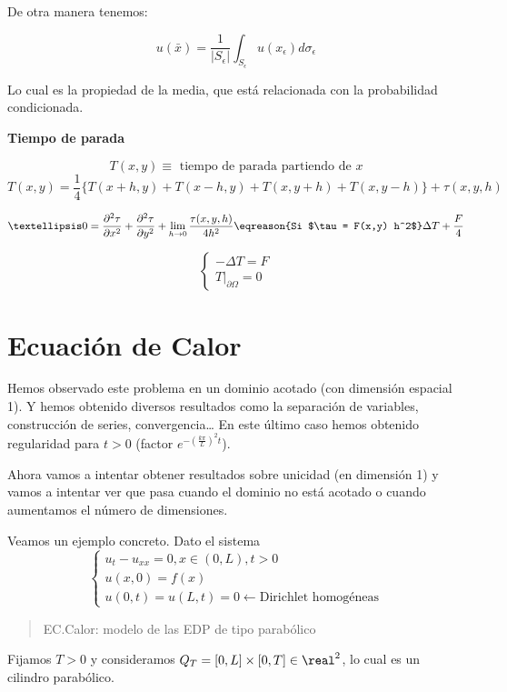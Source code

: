 		De otra manera tenemos:

		\[ u(\bar{x}) = \frac{1}{|S_\epsilon|}\int_{S_\epsilon} u(x_\epsilon) d \sigma_{\epsilon}\]

		Lo cual es la propiedad de la media, que está relacionada con la probabilidad condicionada.

		\textbf{Tiempo de parada}

		\[ T(x,y) \equiv \text{ tiempo de parada partiendo de } x\]
		\[ T(x,y) = \frac{1}{4} \{ T(x+h,y) + T(x-h,y) + T(x,y+h) + T(x,y-h) \} + \tau(x,y,h)\]

		\[ … 0 = \frac{\partial^2\tau}{\partial x^2} + \frac{\partial^2 \tau}{\partial y^2} + \lim_{h \to 0} \frac{\tau(x,y,h)}{4h^2} \eqreason{Si $\tau = F(x,y) h^2$} \Delta T + \frac{F}{4} \]

		\[ \begin{cases}
			-\Delta T = F \\
			T |_{\partial \Omega} = 0
		\end{cases}\]


\section{Ecuación de Calor}

	Hemos observado este problema en un dominio acotado (con dimensión espacial 1). Y hemos obtenido diversos resultados como la separación de variables, construcción de series, convergencia… En este último caso hemos obtenido regularidad para $t > 0$ (factor $e^{-\left(\frac{k \pi}{L}\right)^2 t}$).

	Ahora vamos a intentar obtener resultados sobre unicidad (en dimensión 1) y vamos a intentar ver que pasa cuando el dominio no está acotado o cuando aumentamos el número de dimensiones.

	Veamos un ejemplo concreto. Dato el sistema \[ \begin{cases}
		u_{t} - u_{xx} = 0, x \in (0,L), t > 0 \\
		u(x,0) = f(x) \\
		u(0,t) = u(L,t) = 0 \leftarrow \text{Dirichlet homogéneas}
	 \end{cases}\]

	 \begin{quote}
	 	EC.Calor: modelo de las EDP de tipo parabólico
	 \end{quote}

	 Fijamos $T > 0$ y consideramos $Q_T = [0,L]\times [0,T] \in \real^2$, lo cual es un cilindro parabólico.

